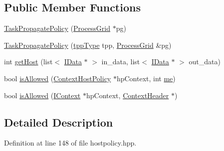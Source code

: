 \subsection*{Public Member Functions}
\begin{DoxyCompactItemize}
\item 
\hyperlink{class_task_propagate_policy_aec820f83379ecb6be2fb180f59db893b}{TaskPropagatePolicy} (\hyperlink{class_process_grid}{ProcessGrid} $\ast$pg)
\item 
\hyperlink{class_task_propagate_policy_afd45667da097ff87f11f8a63d396f5c6}{TaskPropagatePolicy} (\hyperlink{class_task_propagate_policy_a6c683eb92ff5d4fb9ea0b083732c13fd}{tppType} tpp, \hyperlink{class_process_grid}{ProcessGrid} \&pg)
\item 
int \hyperlink{class_task_propagate_policy_a7fb05d7f6392bbe12c1d071d4dd529d7}{getHost} (list$<$ \hyperlink{class_i_data}{IData} $\ast$ $>$ in\_\-data, list$<$ \hyperlink{class_i_data}{IData} $\ast$ $>$ out\_\-data)
\item 
bool \hyperlink{class_task_propagate_policy_af5be0fe1cf14a044035d62b5b40c2093}{isAllowed} (\hyperlink{class_context_host_policy}{ContextHostPolicy} $\ast$hpContext, int \hyperlink{mpi__comm_8hpp_a94bbc6e3d7712df24be96e5e83d0aaf8}{me})
\item 
bool \hyperlink{class_task_propagate_policy_a5dda297fceb4379ba92f8e2e0e899f2a}{isAllowed} (\hyperlink{class_i_context}{IContext} $\ast$hpContext, \hyperlink{class_context_header}{ContextHeader} $\ast$)
\end{DoxyCompactItemize}


\subsection{Detailed Description}


Definition at line 148 of file hostpolicy.hpp.

